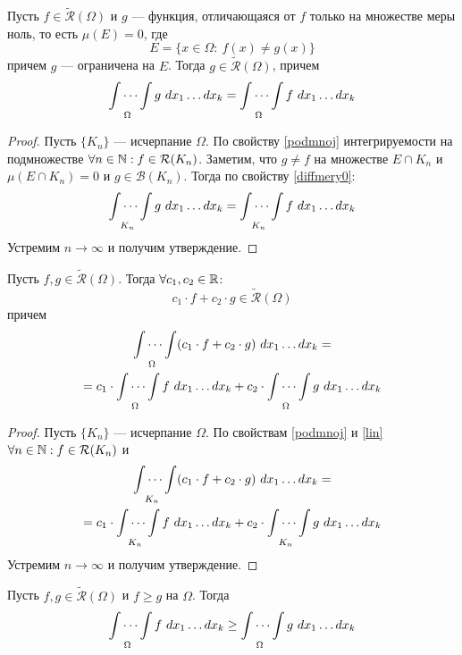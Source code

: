 \begin{statement}
    Пусть $f\in \widetilde{\mathcal{R}}(\Omega)$ и $g$ --- функция, отличающаяся от $f$ только на множестве меры ноль, то есть $\mu(E)=0$, где 
    \[E=\{x\in \Omega:\ f(x)\neq g(x)\}\] 
    причем $g$ --- ограничена на $E$. Тогда $g\in \widetilde{\mathcal{R}}(\Omega)$, причем
    \[\idotsint\limits_{\Omega}g\ dx_1 \dots dx_k=\idotsint\limits_{\Omega}f\ dx_1 \dots dx_k\]
\end{statement}
\begin{proof}
    Пусть $\{K_n\}$ --- исчерпание $\Omega$. По свойству \ref{podmnoj} интегрируемости на подмножестве $\forall n\in \mathbb{N}: f\in \mathcal{R}(K_n)$. Заметим, что $g\neq f$ на множестве $E\cap K_n$ и $\mu(E\cap K_n)=0$ и $g\in \mathcal{B}(K_n)$. Тогда по свойству \ref{diffmery0}:
    \[\idotsint\limits_{K_n}g\ dx_1 \dots dx_k=\idotsint\limits_{K_n}f\ dx_1\dots dx_k\]
    Устремим $n\to \infty$ и получим утверждение.
\end{proof}
\begin{statement}
    Пусть $f, g\in \widetilde{\mathcal{R}}(\Omega)$. Тогда $\forall c_1, c_2\in \mathbb{R}$:
    \[c_1\cdot f+c_2\cdot g\in \widetilde{\mathcal{R}}(\Omega)\]
    причем
    \begin{multline*}
        \idotsint\limits_{\Omega}(c_1\cdot f+c_2\cdot g)\ dx_1\dots dx_k=\\
        =c_1\cdot \idotsint\limits_{\Omega}f\ dx_1\dots dx_k+c_2\cdot \idotsint\limits_{\Omega}g\ dx_1\dots dx_k
    \end{multline*}
\end{statement}
\begin{proof}
    Пусть $\{K_n\}$ --- исчерпание $\Omega$. По свойствам \ref{podmnoj} и \ref{lin}\\
    $\forall n\in \mathbb{N}: f\in \mathcal{R}(K_n)$ и
    \begin{multline*}
        \idotsint\limits_{K_n}(c_1\cdot f+c_2\cdot g)\ dx_1\dots dx_k=\\
        =c_1\cdot \idotsint\limits_{K_n}f\ dx_1\dots dx_k+c_2\cdot \idotsint\limits_{K_n}g\ dx_1\dots dx_k
    \end{multline*}
    Устремим $n\to \infty$ и получим утверждение.
\end{proof}
\begin{statement}%
    Пусть $f,g\in \widetilde{\mathcal{R}}(\Omega)$ и $f\geq g$ на $\Omega$. Тогда 
    \[\idotsint\limits_{\Omega}f\ dx_1\dots dx_k\geq \idotsint\limits_{\Omega}g\ dx_1 \dots dx_k\]
\end{statement}
